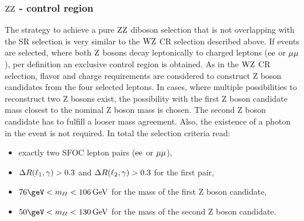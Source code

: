 \subsubsection*{$\mathrm{Z}\mathrm{Z}$ - control region}
The strategy to achieve a pure $\mathrm{Z}\mathrm{Z}$ diboson selection that is not overlapping with the SR selection is very similar to the $\mathrm{W}\mathrm{Z}$ CR selection described above. If events are selected, where both $\mathrm{Z}$ bosons decay leptonically to charged leptons ($\mathrm{e}\mathrm{e}$ or $\mu\mu$), per definition an exclusive control region is obtained. As in the $\mathrm{W}\mathrm{Z}$ CR selection, flavor and charge requirements are considered to construct Z boson candidates from the four selected leptons. In cases, where multiple possibilities to reconstruct two Z bosons exist, the possibility with the first Z boson candidate mass closest to the nominal Z boson mass is chosen. The second Z boson candidate has to fulfill a looser mass agreement. Also, the existence of a photon in the event is not required. In total the selection criteria read:
\begin{itemize}
 \item exactly two SFOC lepton pairs ($\mathrm{e}\mathrm{e}$ or $\mu\mu$),
 \item $\Delta R(\ell_1,\gamma)>0.3$ and $\Delta R(\ell_2,\gamma)>0.3$ for the first pair,
 \item $76\geV<m_{\ell\ell}<106\GeV$ for the mass of the first Z boson candidate,
 \item $50\geV<m_{\ell\ell}<130\GeV$ for the mass of the second Z boson candidate.
\end{itemize}
